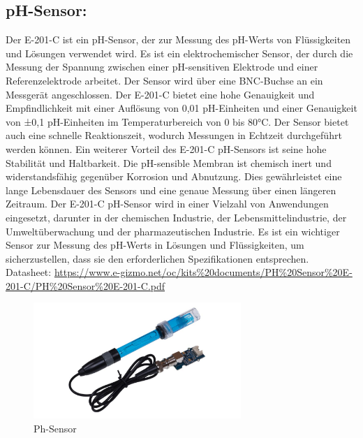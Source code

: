 \subsection*{pH-Sensor:}
Der E-201-C ist ein pH-Sensor, der zur Messung des pH-Werts von Flüssigkeiten und Lösungen verwendet wird. 
Es ist ein elektrochemischer Sensor, der durch die Messung der Spannung zwischen einer pH-sensitiven Elektrode und einer Referenzelektrode arbeitet.
Der Sensor wird über eine BNC-Buchse an ein Messgerät angeschlossen.
Der E-201-C bietet eine hohe Genauigkeit und Empfindlichkeit mit einer Auflösung von 0,01 pH-Einheiten und einer Genauigkeit von ±0,1 pH-Einheiten im Temperaturbereich von 0 bis 80°C. Der Sensor bietet auch eine schnelle Reaktionszeit, wodurch Messungen in Echtzeit durchgeführt werden können.
Ein weiterer Vorteil des E-201-C pH-Sensors ist seine hohe Stabilität und Haltbarkeit. Die pH-sensible Membran ist chemisch inert und widerstandsfähig gegenüber Korrosion und Abnutzung. Dies gewährleistet eine lange Lebensdauer des Sensors und eine genaue Messung über einen längeren Zeitraum.
Der E-201-C pH-Sensor wird in einer Vielzahl von Anwendungen eingesetzt, darunter in der chemischen Industrie, der Lebensmittelindustrie, der Umweltüberwachung und der pharmazeutischen Industrie. Es ist ein wichtiger Sensor zur Messung des pH-Werts in Lösungen und Flüssigkeiten, um sicherzustellen, dass sie den erforderlichen Spezifikationen entsprechen. 
\newline
Datasheet: \url{https://www.e-gizmo.net/oc/kits%20documents/PH%20Sensor%20E-201-C/PH%20Sensor%20E-201-C.pdf}

\begin{figure}[b]
    \centering
    \includegraphics[width=0.7\textwidth]{./pics/pHSensorBild.jpeg}
    \caption{Ph-Sensor}
    \label{fig:TTGO-ESP32}
\end{figure}
\cite{Ph-Sensor}

\newpage
